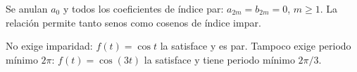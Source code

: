 Se anulan \(a_0\) y todos los coeficientes de índice par: \(a_{2m}=b_{2m}=0\), \(m\ge1\). La relación permite tanto senos como cosenos de índice impar.

No exige imparidad: \(f(t)=\cos t\) la satisface y es par. Tampoco exige periodo mínimo \(2\pi\): \(f(t)=\cos(3t)\) la satisface y tiene periodo mínimo \(2\pi/3\).
